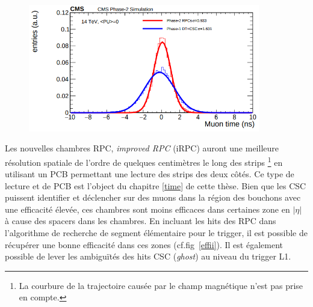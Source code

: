 \begin{itemize}[label=$\bullet$]
	\begin{figure}[ht!]
		\centering
		\includegraphics[width=0.90\textwidth]{RPC/intrasec.png}
		\label{intrasec}
	\end{figure}
	Les nouvelles chambres RPC, \textit{improved RPC} (iRPC) auront une meilleure résolution spatiale de l'ordre de quelques centimètres le long des strips \footnote{La courbure de la trajectoire causée par le champ magnétique n'est pas prise en compte.} en utilisant un PCB permettant une lecture des strips des deux côtés. Ce type de lecture et de PCB est l'object du chapitre \ref{time} de cette thèse.
	\newpage
	Bien que les CSC puissent identifier et déclencher sur des muons dans la région des bouchons avec une efficacité élevée, ces chambres sont moins efficaces dans certaines zone en $|\eta|$ à cause des spacers dans les chambres. En incluant les hits des RPC dans l'algorithme de recherche de segment élémentaire pour le trigger, il est possible de récupérer une bonne efficacité dans ces zones (cf.fig~\ref{effii}). Il est également possible de lever les ambiguïtés des hits CSC (\textit{ghost})  au niveau du trigger L1.
	

\end{itemize}
